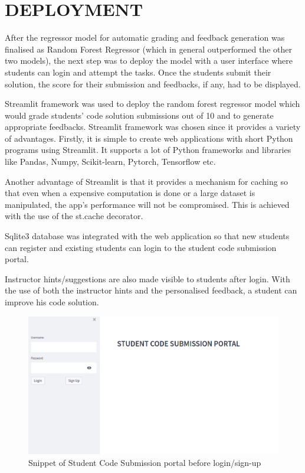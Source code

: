 
\chapter{DEPLOYMENT}

After the regressor model for automatic grading and feedback
generation was finalised as Random Forest Regressor (which in general
outperformed the other two models), the next step was to deploy the
model with a user interface where students can login and attempt the
tasks. Once the students submit their solution, the score for their
submission and feedbacks, if any, had to be displayed.

Streamlit framework was used to deploy the random forest regressor
model which would grade students' code solution submissions out of 10
and to generate appropriate feedbacks. Streamlit framework was chosen
since it provides a variety of advantages. Firstly, it is simple to
create web applications with short Python programs using Streamlit. It
supports a lot of Python frameworks and libraries like Pandas, Numpy,
Scikit-learn, Pytorch, Tensorflow etc.

Another advantage of Streamlit is that it provides a mechanism for
caching so that even when a expensive computation is done or a large
dataset is manipulated, the app's performance will not be compromised.
This is achieved with the use of the st.cache decorator.

Sqlite3 database was integrated with the web application so that new
students can register and existing students can login to the student
code submission portal.

Instructor hints/suggestions are also made visible to students after
login. With the use of both the instructor hints and the personalised
feedback, a student can improve his code solution.

\newpage
\begin{figure}[H]
\centering
\includegraphics[scale=0.56,frame]{./figures/dep1.png}
\caption{Snippet of Student Code Submission portal before login/sign-up}
\label{fig1}
\end{figure}

